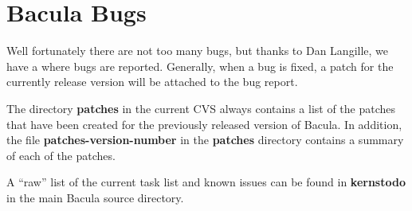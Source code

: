 
\section*{Bacula Bugs}
\label{_ChapterStart4}

Well fortunately there are not too many bugs, but thanks to Dan Langille, we
have a 
 where bugs are reported.
Generally, when a bug is fixed, a patch for the currently release version will
be attached to the bug report.

The directory {\bf patches} in the current CVS always contains a list of 
the patches that have been created for the previously released version
of Bacula. In addition, the file {\bf patches-version-number} in the 
{\bf patches} directory contains a summary of each of the patches.

A ``raw'' list of the current task list and known issues can be found in {\bf
kernstodo} in the main Bacula source directory. 
